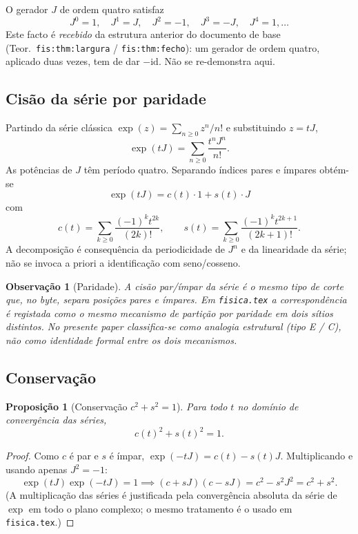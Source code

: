 \documentclass[11pt,a4paper]{article}
\newtheorem{proposicao}{Proposição}
\newtheorem{observacao}{Observação}
\begin{document}
O gerador \(J\) de ordem quatro satisfaz
\[
J^0=1,\quad J^1=J,\quad J^2=-1,\quad J^3=-J,\quad J^4=1,\dots
\]
Este facto é \emph{recebido} da estrutura anterior do documento de base (Teor.\ \texttt{fis:thm:largura} / \texttt{fis:thm:fecho}): um gerador de ordem quatro, aplicado duas vezes, tem de dar \(-\mathrm{id}\). Não se re-demonstra aqui.

\subsection{Cisão da série por paridade}

Partindo da série clássica \(\exp(z)=\sum_{n\ge0}z^n/n!\) e substituindo \(z=tJ\),
\[
\exp(tJ)=\sum_{n\ge0}\frac{t^n J^n}{n!}.
\]
As potências de \(J\) têm período quatro. Separando índices pares e ímpares obtém-se
\[
\boxed{\exp(tJ)=c(t)\cdot 1+s(t)\cdot J}
\]
com
\[
c(t)=\sum_{k\ge0}\frac{(-1)^k t^{2k}}{(2k)!},\qquad
s(t)=\sum_{k\ge0}\frac{(-1)^k t^{2k+1}}{(2k+1)!}.
\]
A decomposição é consequência da periodicidade de \(J^n\) e da linearidade da série; não se invoca a priori a identificação com seno/cosseno.

\begin{observacao}[Paridade]
A cisão par/ímpar da série é o mesmo tipo de corte que, no byte, separa posições pares e ímpares. Em \texttt{fisica.tex} a correspondência é registada como o mesmo mecanismo de partição por paridade em dois sítios distintos. No presente paper classifica-se como \emph{analogia estrutural} (tipo E / C), não como identidade formal entre os dois mecanismos.
\end{observacao}

\subsection{Conservação}

\begin{proposicao}[Conservação \(c^2+s^2=1\)]
\label{prop:cs-conserva}
Para todo \(t\) no domínio de convergência das séries,
\[
c(t)^2+s(t)^2=1.
\]
\end{proposicao}

\begin{proof}
Como \(c\) é par e \(s\) é ímpar, \(\exp(-tJ)=c(t)-s(t)J\). Multiplicando e usando apenas \(J^2=-1\):
\[
\exp(tJ)\exp(-tJ)=1
\implies
(c+sJ)(c-sJ)=c^2-s^2 J^2=c^2+s^2.
\]
(A multiplicação das séries é justificada pela convergência absoluta da série de \(\exp\) em todo o plano complexo; o mesmo tratamento é o usado em \texttt{fisica.tex}.)
\end{proof}
\end{document}
